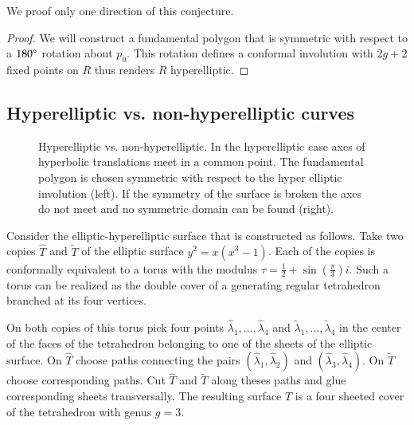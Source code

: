 \documentclass[Thesis]{subfiles}
\begin{document}
We proof only one direction of this conjecture.

\begin{proof}
We will construct a fundamental polygon that is symmetric with respect to a $180\degree$ rotation about $p_0$.
This rotation defines a conformal involution with $2g+2$ fixed points on $R$ thus renders $R$ hyperelliptic.
\end{proof}

\subsection{Hyperelliptic vs. non-hyperelliptic curves}
\label{sec:non-hyperelliptic}

\begin{figure}
\centering
{}
\caption{Hyperelliptic vs. non-hyperelliptic. In the hyperelliptic case axes of hyperbolic translations meet in a common point. The fundamental polygon is chosen symmetric with respect to the hyper elliptic involution (left). If the symmetry of the surface is broken the axes do not meet and no symmetric domain can be found (right).}
\label{fig:non-hyperelliptic}
\end{figure}

Consider the elliptic-hyperelliptic surface that is constructed as follows. Take two copies $\hat T$ and $\tilde T$ of the elliptic surface $y^2=x(x^3 - 1)$. Each of the copies is conformally equivalent to a torus with the modulus $\tau=\frac{1}{2}+\sin(\frac{\pi}{3})i$. Such a torus can be realized as the double cover of a generating regular tetrahedron branched at its four vertices.

On both copies of this torus pick four points $\hat\lambda_1,\ldots,\hat\lambda_4$ and $\tilde\lambda_1,\ldots,\tilde\lambda_4$ in the center of the faces of the tetrahedron belonging to one of the sheets of the elliptic surface. On $\hat T$ choose paths connecting the pairs $(\hat\lambda_1,\hat\lambda_2)$ and $(\hat\lambda_3,\hat\lambda_4)$. On $\tilde T$ choose corresponding paths. Cut $\hat T$ and $\tilde T$ along theses paths and glue corresponding sheets transversally. The resulting surface $T$ is a four sheeted cover of the tetrahedron with genus $g = 3$.
\end{document}
